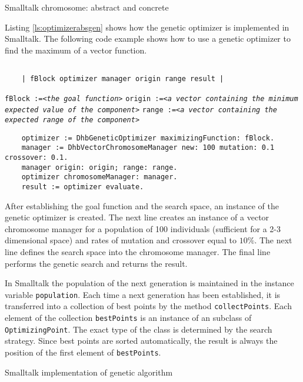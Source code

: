 \documentclass[twoside]{book}
\begin{document}
\begin{listing} Smalltalk chromosome: abstract and concrete \label{ls:chromosome}


\end{listing}
Listing \ref{ls:optimizerabsgen} shows how the genetic optimizer
is implemented in Smalltalk. The following code example shows how
to use a genetic optimizer to find the maximum of a vector
function.
\begin{codeExample}
\begin{verbatim}

    | fBlock optimizer manager origin range result |
\end{verbatim}
 {\tt fBlock :=<\sl the goal function\tt >}\hfil\break
 {\tt origin :=<\sl a vector containing the minimum expected value of the component\tt >}\hfil\break
 {\tt range :=<\sl a vector containing the expected range of the component\tt >}\hfil\break
\begin{verbatim}
    optimizer := DhbGeneticOptimizer maximizingFunction: fBlock.
    manager := DhbVectorChromosomeManager new: 100 mutation: 0.1 crossover: 0.1.
    manager origin: origin; range: range.
    optimizer chromosomeManager: manager.
    result := optimizer evaluate.
\end{verbatim}
\end{codeExample}
After establishing the goal function and the search space, an
instance of the genetic optimizer is created. The next line
creates an instance of a vector chromosome manager for a
population of 100 individuals (sufficient for a 2-3 dimensional
space) and rates of mutation and crossover equal to $10\%$. The
next line defines the search space into the chromosome manager.
The final line performs the genetic search and returns the result.

In Smalltalk the population of the next generation is maintained
in the instance variable {\tt population}. Each time a next
generation has been established, it is transferred into a
collection of best points by the method {\tt collectPoints}. Each
element of the collection {\tt bestPoints} is an instance of an
subclass of {\tt OptimizingPoint}. The exact type of the class is
determined by the search strategy. Since best points are sorted
automatically, the result is always the position of the first
element of  {\tt bestPoints}.

\begin{listing} Smalltalk implementation of genetic algorithm \label{ls:optimizerabsgen}

\end{listing}
\end{document}
